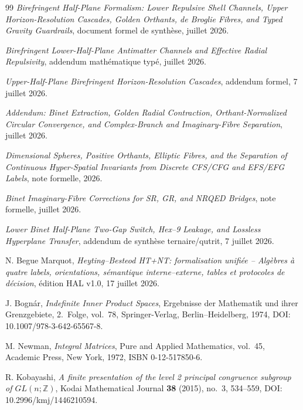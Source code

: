 \documentclass[11pt,a4paper]{article}
\begin{document}
\renewcommand{\refname}{Références documentaires du corpus}
\begin{thebibliography}{99}
\emph{Birefringent Half-Plane Formalism: Lower Repulsive Shell Channels, Upper Horizon-Resolution Cascades, Golden Orthants, de Broglie Fibres, and Typed Gravity Guardrails}, document formel de synthèse, juillet 2026.

\emph{Birefringent Lower-Half-Plane Antimatter Channels and Effective Radial Repulsivity}, addendum mathématique typé, juillet 2026.

\emph{Upper-Half-Plane Birefringent Horizon-Resolution Cascades}, addendum formel, 7 juillet 2026.

\emph{Addendum: Binet Extraction, Golden Radial Contraction, Orthant-Normalized Circular Convergence, and Complex-Branch and Imaginary-Fibre Separation}, juillet 2026.

\emph{Dimensional Spheres, Positive Orthants, Elliptic Fibres, and the Separation of Continuous Hyper-Spatial Invariants from Discrete CFS/CFG and EFS/EFG Labels}, note formelle, 2026.

\emph{Binet Imaginary-Fibre Corrections for SR, GR, and NRQED Bridges}, note formelle, juillet 2026.

\emph{Lower Binet Half-Plane Two-Gap Switch, Hex--9 Leakage, and Lossless Hyperplane Transfer}, addendum de synthèse ternaire/qutrit, 7 juillet 2026.

N. Begue Marquot, \emph{Heyting--Besteod HT+NT: formalisation unifiée -- Algèbres à quatre labels, orientations, sémantique interne--externe, tables et protocoles de décision}, édition HAL v1.0, 17 juillet 2026.

J. Bognár, \emph{Indefinite Inner Product Spaces}, Ergebnisse der Mathematik und ihrer Grenzgebiete, 2.~Folge, vol.~78, Springer-Verlag, Berlin--Heidelberg, 1974, DOI: 10.1007/978-3-642-65567-8.

M. Newman, \emph{Integral Matrices}, Pure and Applied Mathematics, vol.~45, Academic Press, New York, 1972, ISBN 0-12-517850-6.

R. Kobayashi, \emph{A finite presentation of the level 2 principal congruence subgroup of $GL(n;\mathbb Z)$},
Kodai Mathematical Journal \textbf{38} (2015), no.~3, 534--559, DOI: 10.2996/kmj/1446210594.


\end{thebibliography}
\end{document}
